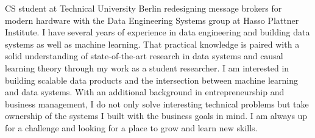 

\begin{cvparagraph}

CS student at Technical University Berlin redesigning message brokers for modern hardware with the Data Engineering Systems group at Hasso Plattner Institute. I have several years of experience in data engineering and building data systems as well as machine learning. That practical knowledge is paired with a solid understanding of state-of-the-art research in data systems and causal learning theory through my work as a student researcher.  I am interested in building scalable data products and the intersection between machine learning and data systems. With an additional background in entrepreneurship and business management, I do not only solve interesting technical problems but take ownership of the systems I built with the business goals in mind. I am always up for a challenge and looking for a place to grow and learn new skills.
\end{cvparagraph}
